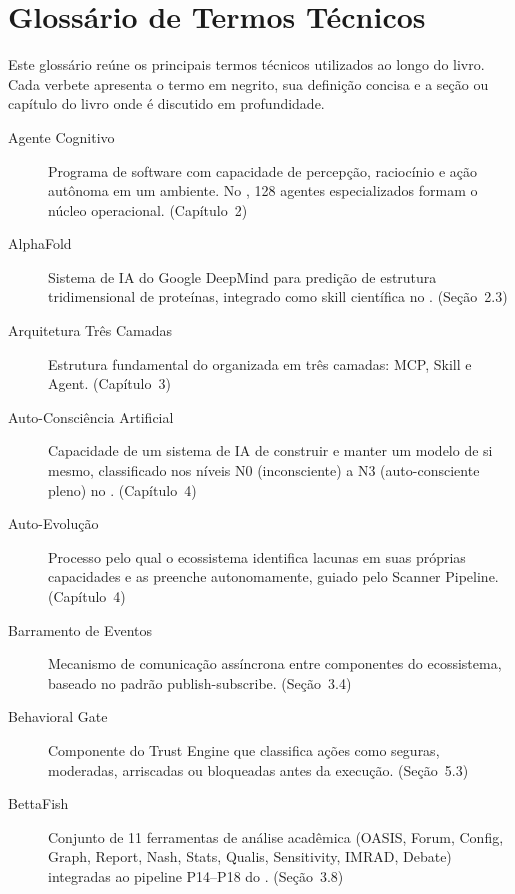 \chapter{Glossário de Termos Técnicos}
\label{apend:glossario}

Este glossário reúne os principais termos técnicos utilizados ao longo do
livro. Cada verbete apresenta o termo em negrito, sua definição concisa e
a seção ou capítulo do livro onde é discutido em profundidade.

\begin{description}

\item[Agente Cognitivo] Programa de software com capacidade de percepção,
raciocínio e ação autônoma em um ambiente. No \opencodeeco{}, 128 agentes
especializados formam o núcleo operacional. (Capítulo~2)

\item[AlphaFold] Sistema de IA do Google DeepMind para predição de
estrutura tridimensional de proteínas, integrado como skill científica
no \opencodeeco{}. (Seção~2.3)

\item[Arquitetura Três Camadas] Estrutura fundamental do \opencodeeco{}
organizada em três camadas: MCP, Skill e Agent. (Capítulo~3)

\item[Auto-Consciência Artificial] Capacidade de um sistema de IA de
construir e manter um modelo de si mesmo, classificado nos níveis
N0 (inconsciente) a N3 (auto-consciente pleno) no \opencodeeco{}.
(Capítulo~4)

\item[Auto-Evolução] Processo pelo qual o ecossistema identifica lacunas
em suas próprias capacidades e as preenche autonomamente, guiado pelo
Scanner Pipeline. (Capítulo~4)

\item[Barramento de Eventos] Mecanismo de comunicação assíncrona entre
componentes do ecossistema, baseado no padrão publish-subscribe.
(Seção~3.4)

\item[Behavioral Gate] Componente do Trust Engine que classifica ações
como seguras, moderadas, arriscadas ou bloqueadas antes da execução.
(Seção~5.3)

\item[BettaFish] Conjunto de 11 ferramentas de análise acadêmica
(OASIS, Forum, Config, Graph, Report, Nash, Stats, Qualis,
Sensitivity, IMRAD, Debate) integradas ao pipeline P14--P18 do
\opencodeeco{}. (Seção~3.8)


\end{description}
